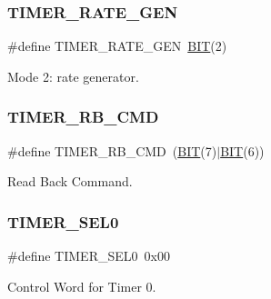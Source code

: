 \hypertarget{group__i8254_ga5d4449e0fa1cf4a4d107a48a04a1265f}{}\label{group__i8254_ga5d4449e0fa1cf4a4d107a48a04a1265f} 
\subsubsection{\texorpdfstring{T\+I\+M\+E\+R\+\_\+\+R\+A\+T\+E\+\_\+\+G\+EN}{TIMER\_RATE\_GEN}}
{\footnotesize\ttfamily \#define T\+I\+M\+E\+R\+\_\+\+R\+A\+T\+E\+\_\+\+G\+EN~\hyperlink{video__gr_8c_a3a8ea58898cb58fc96013383d39f482c}{B\+IT}(2)}



Mode 2\+: rate generator. 

\hypertarget{group__i8254_ga4c2eecbfb96744a9c2af71dba75ecb18}{}\label{group__i8254_ga4c2eecbfb96744a9c2af71dba75ecb18} 
\subsubsection{\texorpdfstring{T\+I\+M\+E\+R\+\_\+\+R\+B\+\_\+\+C\+MD}{TIMER\_RB\_CMD}}
{\footnotesize\ttfamily \#define T\+I\+M\+E\+R\+\_\+\+R\+B\+\_\+\+C\+MD~(\hyperlink{video__gr_8c_a3a8ea58898cb58fc96013383d39f482c}{B\+IT}(7)$\vert$\hyperlink{video__gr_8c_a3a8ea58898cb58fc96013383d39f482c}{B\+IT}(6))}



Read Back Command. 

\hypertarget{group__i8254_ga6a4822642d40c248435692324a818010}{}\label{group__i8254_ga6a4822642d40c248435692324a818010} 
\subsubsection{\texorpdfstring{T\+I\+M\+E\+R\+\_\+\+S\+E\+L0}{TIMER\_SEL0}}
{\footnotesize\ttfamily \#define T\+I\+M\+E\+R\+\_\+\+S\+E\+L0~0x00}



Control Word for Timer 0. 

\hypertarget{group__i8254_ga8349623fd8d99f9cc5d8ae29d78594fc}{}\label{group__i8254_ga8349623fd8d99f9cc5d8ae29d78594fc} 
